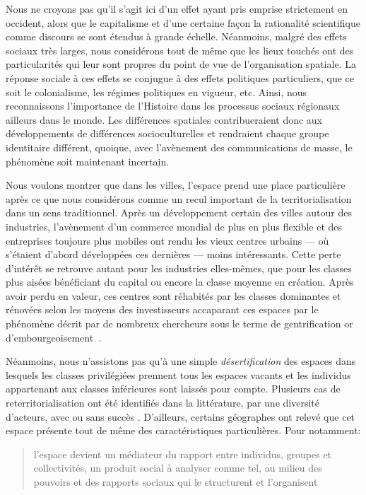 Nous ne croyons pas qu'il s'agit ici d'un effet ayant pris emprise strictement en occident, alors que le capitalisme et d'une certaine façon la rationalité scientifique comme discours se sont étendus à grande échelle.
Néanmoins, malgré des effets sociaux très larges, nous considérons tout de même que les lieux touchés ont des particularités qui leur sont propres du point de vue de l'organisation spatiale.
La réponse sociale à ces effets se conjugue à des effets politiques particuliers, que ce soit le colonialisme, les régimes politiques en vigueur, etc.
Ainsi, nous reconnaissons l'importance de l'Histoire dans les processus sociaux régionaux ailleurs dans le monde.
Les différences spatiales contribueraient donc aux développements de différences socioculturelles et rendraient chaque groupe identitaire différent, quoique, avec l'avènement des communications de masse, le phénomène soit maintenant incertain.

Nous voulons montrer que dans les villes, l'espace prend une place particulière après ce que nous considérons comme un recul important de la territorialisation dans un sens traditionnel.
Après un développement certain des villes autour des industries, l'avènement d'un commerce mondial de plus en plus flexible et des entreprises toujours plus mobiles ont rendu les vieux centres urbains --- où s'étaient d'abord développées ces dernières --- moins intéressants.
Cette perte d'intérêt se retrouve autant pour les industries elles-mêmes, que pour les classes plus aisées bénéficiant du capital ou encore la classe moyenne en création.
Après avoir perdu en valeur, ces centres sont réhabités par les classes dominantes et rénovées selon les moyens des investisseurs accaparant ces espaces par le phénomène décrit par de nombreux chercheurs sous le terme de gentrification or d'embourgeoisement~\citep[voir][211--217]{Pacione2009}.

Néanmoins, nous n'assistons pas qu'à une simple \emph{désertification} des espaces dans lesquels les classes privilégiées prennent tous les espaces vacants et les individus appartenant aux classes inférieures sont laissés pour compte.
Plusieurs cas de reterritorialisation ont été identifiés dans la littérature, par une diversité d'acteurs, avec ou sans succès \citep[un exemple est le cas de Québec, où le quartier Saint-Roch est passé de quartier ouvrier  à un chantier de rénovation urbaine où se sont organisées plusieurs formes de résistances populaires. Voir][]{Hatvany2005}.
D'ailleurs, certains géographes ont relevé que cet espace présente tout de même des caractéristiques particulières.
Pour \citeauthor{Courville1991} notamment: \blockquote[{\cite[41]{Courville1991}}][.]{l'espace devient un médiateur du rapport entre individus, groupes et collectivités, un produit social à analyser comme tel, au milieu des pouvoirs et des rapports sociaux qui le structurent et l'organisent}.

